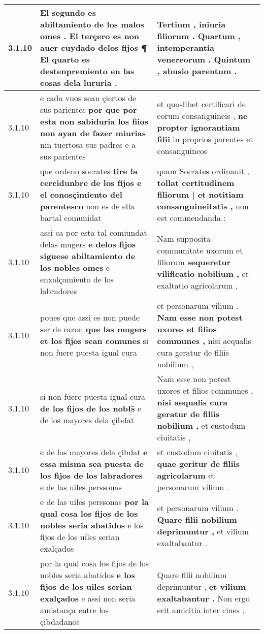 \begin{tabular}{|p{1cm}|p{6.5cm}|p{6.5cm}|}
3.1.10 & El segundo es abiltamiento de los malos omes . \textbf{ El terçero es non auer cuydado delos fijos ¶ } El quarto es destenpremiento en las cosas dela lururia . & Tertium , iniuria filiorum . \textbf{ Quartum , intemperantia venereorum . } Quintum , abusio parentum . \\\hline
3.1.10 & e cada vnos sean çiertos de sus parientes \textbf{ por que por esta non sabiduria los fiios non ayan de fazer miurias } nin tuertosa sus padres e a sus parientes & et quoslibet certificari de eorum consanguineis , \textbf{ ne propter ignorantiam filii } in proprios parentes et consanguineos \\\hline
3.1.10 & que ordeno socrates \textbf{ tire la cercidunbre de los fijos e el conosçimiento del parentesco } non es de ella bartal comunidat & quam Socrates ordinauit , \textbf{ tollat certitudinem filiorum | et notitiam consanguineitatis , } non est commendanda : \\\hline
3.1.10 & assi ca por esta tal comiundat delas mugers \textbf{ e delos fijos siguese abiltamiento de los nobles omes } e enxalçamiento de los labradores & Nam supposita communitate uxorum et filiorum \textbf{ sequeretur vilificatio nobilium , } et exaltatio agricolarum , \\\hline
3.1.10 & poues que assi es non puede ser de razon \textbf{ que las mugers et los fijos sean comunes } si non fuere puesta igual cura & et personarum vilium . \textbf{ Nam esse non potest uxores et filios communes , } nisi aequalis cura geratur de filiis nobilium , \\\hline
3.1.10 & si non fuere puesta igual cura \textbf{ de los fijos de los nobłs̃ } e de los mayores dela çibdat & Nam esse non potest uxores et filios communes , \textbf{ nisi aequalis cura geratur de filiis nobilium , } et custodum ciuitatis , \\\hline
3.1.10 & e de los mayores dela çibdat \textbf{ e essa misma sea puesta de los fijos de los labradores } e de las uiles perssonas & et custodum ciuitatis , \textbf{ quae geritur de filiis agricolarum } et personarum vilium . \\\hline
3.1.10 & e de las uiles perssonas \textbf{ por la qual cosa los fijos de los nobles seria abatidos } e los fijos de los uiles serian exalçados & et personarum vilium . \textbf{ Quare filii nobilium deprimuntur , } et vilium exaltabantur . \\\hline
3.1.10 & por la qual cosa los fijos de los nobles seria abatidos \textbf{ e los fijos de los uiles serian exalçados } e assi non seria amistança entre los çibdadanos & Quare filii nobilium deprimuntur , \textbf{ et vilium exaltabantur . } Non ergo erit amicitia inter ciues , \\\hline

\end{tabular}
